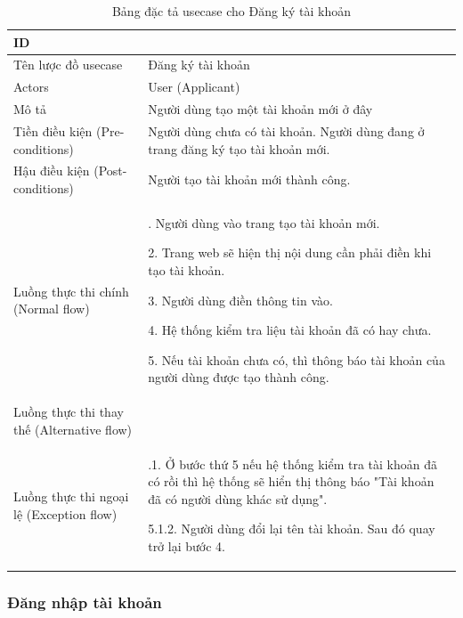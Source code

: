 \begin{table}[H]
    \centering
    \begin{tabular}{|>{\centering\arraybackslash}p{0.3\linewidth}|>{\raggedright\arraybackslash}p{0.7\linewidth}|} \hline 
         ID& 1\\ \hline 
         Tên lược đồ usecase& Đăng ký tài khoản\\ \hline 
         Actors& User (Applicant)\\ \hline 
         Mô tả& Người dùng tạo một tài khoản mới ở đây\\ \hline 
         Tiền điều kiện (Pre-conditions)& Người dùng chưa có tài khoản.
Người dùng đang ở trang đăng ký tạo tài khoản mới.\\ \hline 
 Hậu điều kiện (Post-conditions)&Người tạo tài khoản mới thành công.\\\hline 
         Luồng thực thi chính (Normal flow)& 1. Người dùng vào trang tạo tài khoản mới.

2. Trang web sẽ hiện thị nội dung cần phải điền khi tạo tài khoản.

3. Người dùng điền thông tin vào.

4. Hệ thống kiểm tra liệu tài khoản đã có hay chưa.

5. Nếu tài khoản chưa có, thì thông báo tài khoản của người dùng được tạo thành công.\\ \hline 
         Luồng thực thi thay thế (Alternative flow)& \\ \hline 
         Luồng thực thi ngoại lệ (Exception flow)& 5.1.1. Ở bước thứ 5 nếu hệ thống kiểm tra tài khoản đã có rồi thì hệ thống sẽ hiển thị thông báo "Tài khoản đã có người dùng khác sử dụng".

5.1.2. Người dùng đổi lại tên tài khoản. Sau đó quay trở lại bước 4.\\ \hline
    \end{tabular}
    \caption{Bảng đặc tả usecase cho Đăng ký tài khoản}
    \label{tab:Register}
\end{table}



\subsubsection{Đăng nhập tài khoản}


